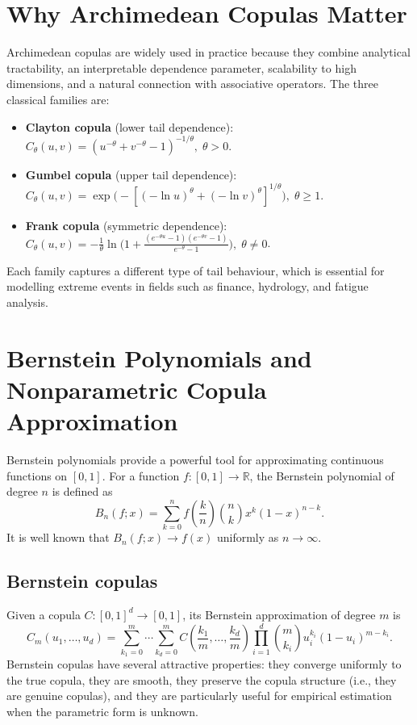 \section{Why Archimedean Copulas Matter}

Archimedean copulas are widely used in practice because they combine analytical tractability, an interpretable dependence parameter, scalability to high dimensions, and a natural connection with associative operators. The three classical families are:

\begin{itemize}
\item \textbf{Clayton copula} (lower tail dependence): \(C_\theta(u,v)=(u^{-\theta}+v^{-\theta}-1)^{-1/\theta},\;\theta>0\).
\item \textbf{Gumbel copula} (upper tail dependence): \(C_\theta(u,v)=\exp\!\bigl(-[(-\ln u)^\theta+(-\ln v)^\theta]^{1/\theta}\bigr),\;\theta\ge1\).
\item \textbf{Frank copula} (symmetric dependence): \(C_\theta(u,v)=-\frac{1}{\theta}\ln\!\bigl(1+\frac{(e^{-\theta u}-1)(e^{-\theta v}-1)}{e^{-\theta}-1}\bigr),\;\theta\neq0\).
\end{itemize}

Each family captures a different type of tail behaviour, which is essential for modelling extreme events in fields such as finance, hydrology, and fatigue analysis.

\section{Bernstein Polynomials and Nonparametric Copula Approximation}

Bernstein polynomials provide a powerful tool for approximating continuous functions on \([0,1]\). For a function \(f:[0,1]\to\mathbb{R}\), the Bernstein polynomial of degree \(n\) is defined as
\[
B_n(f;x)=\sum_{k=0}^n f\!\left(\frac{k}{n}\right)\binom{n}{k}x^k(1-x)^{n-k}.
\]
It is well known that \(B_n(f;x)\to f(x)\) uniformly as \(n\to\infty\).

\subsection{Bernstein copulas}

Given a copula \(C:[0,1]^d\to[0,1]\), its Bernstein approximation of degree \(m\) is
\[
C_m(u_1,\ldots,u_d)=\sum_{k_1=0}^m\cdots\sum_{k_d=0}^m
C\!\left(\frac{k_1}{m},\ldots,\frac{k_d}{m}\right)
\prod_{i=1}^d \binom{m}{k_i} u_i^{k_i}(1-u_i)^{m-k_i}.
\]
Bernstein copulas have several attractive properties: they converge uniformly to the true copula, they are smooth, they preserve the copula structure (i.e., they are genuine copulas), and they are particularly useful for empirical estimation when the parametric form is unknown.

